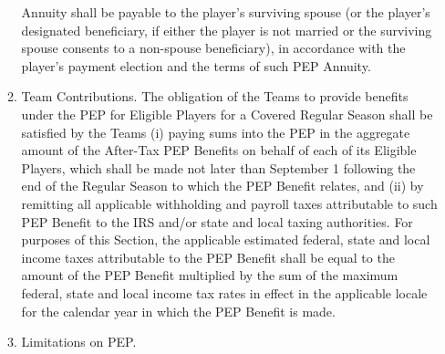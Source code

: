\documentclass[
]{book}
\begin{document}
\begin{enumerate}
\begin{enumerate}
Annuity shall be payable to the player's surviving spouse (or the player's designated beneficiary, if either the player is not married or the surviving spouse consents to a non-spouse beneficiary), in accordance with the player's payment election and the terms of such PEP Annuity.
  \item
    Team Contributions. The obligation of the Teams to provide benefits under the PEP for Eligible Players for a Covered Regular Season shall be satisfied by the Teams (i) paying sums into the PEP in the aggregate amount of the After-Tax PEP Benefits on behalf of each of its Eligible Players, which shall be made not later than September 1 following the end of the Regular Season to which the PEP Benefit relates, and (ii) by remitting all applicable withholding and payroll taxes attributable to such PEP Benefit to the IRS and/or state and local taxing authorities. For purposes of this Section, the applicable estimated federal, state and local income taxes attributable to the PEP Benefit shall be equal to the amount of the PEP Benefit multiplied by the sum of the maximum federal, state and local income tax rates in effect in the applicable locale for the calendar year in which the PEP Benefit is made.
  \item
    Limitations on PEP.


\end{enumerate}
\end{enumerate}
\end{document}

